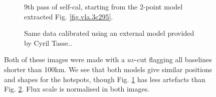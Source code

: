 \begin{figure}[t!]
\centering
\begin{subfigure}{.43\textwidth}
\caption{\label{fig.restored.3c295.VLAmodel.selfcal.uvcut.SC9.normalised} 9th pass of self-cal, starting from the 2-point model extracted Fig. \ref{fig.vla.3c295}.}
\end{subfigure}
\hfill
\begin{subfigure}{.43\textwidth}
\caption{\label{fig.restored.3c295.externalmodel.selfcal.uvcut.SC12.normalised} Same data calibrated using an external model provided by Cyril Tasse..}
\end{subfigure}
\caption{\label{fig.restored.comparison.externalSC12.vlaSC9} Both of these images were made with a $uv$-cut flagging all baselines shorter than 100km. We see that both models give similar positions and shapes for the hotspots, though Fig. \ref{fig.restored.3c295.VLAmodel.selfcal.uvcut.SC9.normalised} has less artefacts than Fig. \ref{fig.restored.3c295.externalmodel.selfcal.uvcut.SC12.normalised}. Flux scale is normalised in both images.}
\end{figure}

